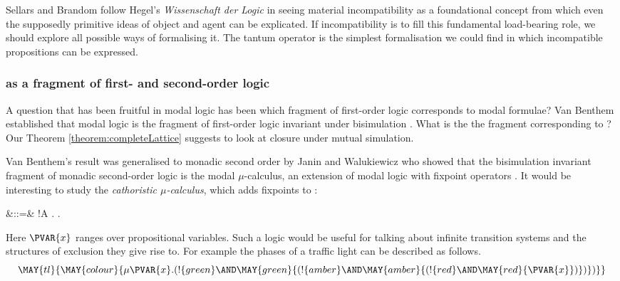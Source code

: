 \NI Sellars and Brandom follow Hegel's \emph{Wissenschaft der Logic}
\cite{HegelGWF:wisdlog} in seeing material incompatibility as a
foundational concept from which even the supposedly primitive ideas of
object and agent can be explicated.  If incompatibility is to fill
this fundamental load-bearing role, we should explore all possible
ways of formalising it.  The tantum operator is the simplest
formalisation we could find in which incompatible propositions can be
expressed.







\subsubsection{\Cathoristic{} as a fragment of first- and second-order logic }

A question that has been fruitful in modal logic has been which
fragment of first-order logic corresponds to modal formulae?  Van
Benthem established that modal logic is the fragment of first-order
logic invariant under bisimulation \cite{BlackburnP:modlog}. What is
the the fragment corresponding to \cathoristic{}? Our Theorem
\ref{theorem:completeLattice} suggests to look at closure under mutual
simulation.  

Van Benthem's result was generalised to monadic second
order by Janin and Walukiewicz \cite{JaninD:expcomotpmcwrtmsol} who
showed that the bisimulation invariant fragment of monadic
second-order logic is the modal $\mu$-calculus, an extension of modal
logic with fixpoint operators \cite{KozenD:respromc}.  It would be
interesting to study the \emph{cathoristic $\mu$-calculus}, which adds
fixpoints to \cathoristic{}:
\begin{GRAMMAR}
  \phi
     &::=&
  \TRUE
     \VERTICAL
  \phi \AND \psi
     \VERTICAL
  \phi
     \VERTICAL
  !A
     \VERTICAL
  \mu {}.\phi
     \VERTICAL
  \nu {}.\phi
     \VERTICAL
\end{GRAMMAR}

\NI Here $\PVAR{x}$ ranges over propositional variables.  Such a logic
would be useful for talking about infinite transition systems and the
structures of exclusion they give rise to.  For example the phases of
a traffic light can be described as follows.
\[
   \MAY{tl}{\MAY{colour}{\mu \PVAR{x}.
       (!\{green\} \AND \MAY{green}{
         (!\{amber\} \AND \MAY{amber}{
           (!\{red\} \AND \MAY{red}{\PVAR{x}})})})}}
\]

